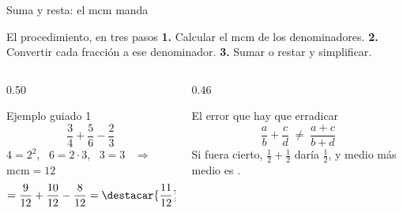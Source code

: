 \documentclass[aspectratio=169,10pt]{beamer}
\begin{document}
\begin{frame}{Suma y resta: el mcm manda}
  \scriptsize
  \begin{block}{El procedimiento, en tres pasos}
    \tiny
    \textbf{1.} Calcular el mcm de los denominadores. \quad
    \textbf{2.} Convertir cada fracción a ese denominador. \quad
    \textbf{3.} Sumar o restar  y simplificar.
  \end{block}

  \vspace{0.08cm}
  \begin{columns}[T,onlytextwidth]
    \begin{column}{0.50\textwidth}
      \begin{exampleblock}{Ejemplo guiado 1}
        \tiny
        \[ \frac{3}{4} + \frac{5}{6} - \frac{2}{3} \]
        $4=2^2$, \ $6=2\cdot 3$, \ $3=3$ \ $\Rightarrow$ \
        $\mathrm{mcm}=12$
        \[ = \frac{9}{12} + \frac{10}{12} - \frac{8}{12}
           = \destacar{\frac{11}{12}} \]
      \end{exampleblock}
    \end{column}
    \begin{column}{0.46\textwidth}
      \begin{alertblock}{El error que hay que erradicar}
        \tiny
        \[ \frac{a}{b} + \frac{c}{d} \;\neq\; \frac{a+c}{b+d} \]
        Si fuera cierto, $\tfrac{1}{2}+\tfrac{1}{2}$ daría $\tfrac{1}{2}$, y
        medio más medio es \destacar{uno}.
      \end{alertblock}
    \end{column}
  \end{columns}
\end{frame}
\end{document}
